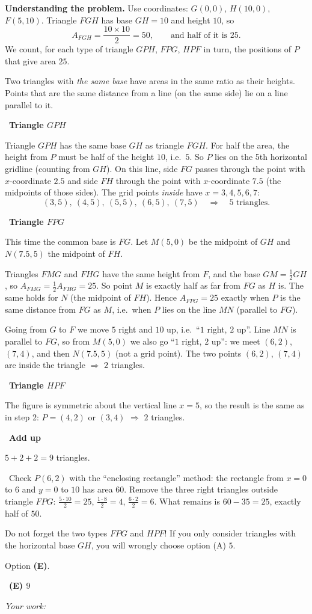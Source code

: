 \documentclass[11pt]{article}
\newif\ifsol \solfalse
\providecommand{\AnsWord}{Đáp số}
\newcommand{\StuProb}[2]{\begin{probboxS}{#1}{#2}\StuProbBody\end{probboxS}}
\newcommand{\ans}[1]{\par\smallskip{\bfseries\color{tmGreen!88!black}\AnsWord:}\ {\bfseries\color{AnsRed}#1}\par}
\newcommand{\probsol}[1]{%
  \begin{lrbox}{\solmeasure}\begin{minipage}{\dimexpr\linewidth-24pt\relax}#1\end{minipage}\end{lrbox}%
  \ifsol
    \begin{solbox}#1\end{solbox}%
  \else
    \setlength{\solht}{\dimexpr\ht\solmeasure+\dp\solmeasure+0.85cm\relax}%
    \ifdim\solht<1.35cm\setlength{\solht}{1.35cm}\fi
    \ifdim\solht>\StudentMaxWork\setlength{\solht}{\StudentMaxWork}\fi
    \par\noindent\begin{minipage}{\linewidth}%
    \expandafter\StuProb\StuProbArgs
    \begin{tcolorbox}[colback=white,colframe=Line,boxrule=0.8pt,arc=5pt,
      left=8pt,right=8pt,top=4pt,bottom=4pt,height=\solht]{\footnotesize\color{Slate}\itshape\WorkWord}\end{tcolorbox}%
    \end{minipage}\par\medskip
  \fi}
\newlength{\StudentMaxWork}\setlength{\StudentMaxWork}{4.5cm}
\newcommand{\step}[2]{\par\smallskip\noindent{\bfseries\color{tmBlue!85!black}\StepWord~#1.}\ {\bfseries #2}\par\nopagebreak}
\newcommand{\verify}[1]{\par\smallskip\noindent{\bfseries\color{tmGreen!80!black}\faCheckCircle\ \CheckWord}\ #1\par}
\def\WorkWord{Your work:}
\def\AnsWord{Answer}
\def\StepWord{Step}
\def\CheckWord{Check:}
\begin{document}
\probsol{
\textbf{Understanding the problem.} Use coordinates: $G(0,0)$, $H(10,0)$, $F(5,10)$. Triangle $FGH$ has base
$GH=10$ and height $10$, so
\[ A_{FGH}=\frac{10\times 10}{2}=50,\qquad \text{and half of it is } 25. \]
We count, for each type of triangle $GPH$, $FPG$, $HPF$ in turn, the positions of $P$ that give area $25$.

\begin{recallbox}Two triangles with \emph{the same base} have areas in the same ratio as their heights.
Points that are the same distance from a line (on the same side) lie on a line parallel to it.\end{recallbox}

\step{1}{Triangle $GPH$}
Triangle $GPH$ has the same base $GH$ as triangle $FGH$. For half the area, the height from $P$ must be half of
the height $10$, i.e.\ $5$. So $P$ lies on the 5th horizontal gridline (counting from $GH$).
On this line, side $FG$ passes through the point with $x$-coordinate $2.5$ and side $FH$ through the point with
$x$-coordinate $7.5$ (the midpoints of those sides). The grid points \emph{inside} have $x=3,4,5,6,7$:
\[ (3,5),\ (4,5),\ (5,5),\ (6,5),\ (7,5)\quad\Rightarrow\quad 5 \text{ triangles.} \]

\step{2}{Triangle $FPG$}
This time the common base is $FG$. Let $M(5,0)$ be the midpoint of $GH$ and $N(7.5,5)$ the midpoint of $FH$.
\begin{proofbox}Triangles $FMG$ and $FHG$ have the same height from $F$, and the base $GM=\tfrac12 GH$, so
$A_{FMG}=\tfrac12 A_{FHG}=25$. So point $M$ is exactly half as far from $FG$ as $H$ is. The same holds for $N$
(the midpoint of $FH$). Hence $A_{FPG}=25$ exactly when $P$ is the same distance from $FG$ as $M$, i.e.\ when $P$
lies on the line $MN$ (parallel to $FG$).\end{proofbox}
Going from $G$ to $F$ we move $5$ right and $10$ up, i.e.\ ``$1$ right, $2$ up''. Line $MN$ is parallel to $FG$,
so from $M(5,0)$ we also go ``$1$ right, $2$ up'': we meet $(6,2)$, $(7,4)$, and then $N(7.5,5)$ (not a grid
point). The two points $(6,2)$, $(7,4)$ are inside the triangle $\Rightarrow$ $2$ triangles.

\step{3}{Triangle $HPF$}
The figure is symmetric about the vertical line $x=5$, so the result is the same as in step 2: $P=(4,2)$ or
$(3,4)$ $\Rightarrow$ $2$ triangles.

\step{4}{Add up}
$5+2+2=9$ triangles.

\verify{Check $P(6,2)$ with the ``enclosing rectangle'' method: the rectangle from $x=0$ to $6$ and $y=0$ to $10$
has area $60$. Remove the three right triangles outside triangle $FPG$: $\tfrac{5\cdot 10}{2}=25$,
$\tfrac{1\cdot 8}{2}=4$, $\tfrac{6\cdot 2}{2}=6$. What remains is $60-35=25$, exactly half of $50$.}
\begin{warnbox}Do not forget the two types $FPG$ and $HPF$! If you only consider triangles with the horizontal base
$GH$, you will wrongly choose option (A) $5$.\end{warnbox}
Option \textbf{(E)}.
\ans{(E) $9$}
}
\end{document}

